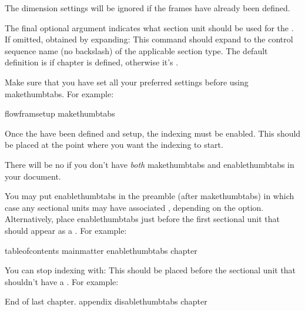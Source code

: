 \documentclass[fontsize=12pt]{scrbook}
\begin{document}
\begin{information}
The dimension settings will be ignored if the 
 frames have already been defined.
\end{information}

The final optional argument 
indicates what section unit should be used for the .
If omitted,  obtained by expanding:
This command should expand to the control sequence name (no
backslash) of the applicable section type. The default definition is
 if \gls{chapter} is defined, otherwise it's
.

Make sure that you have set all your preferred 
settings before using \gls{makethumbtabs}. For example:
\begin{codebox}
\gls{flowframsetup}
\gls{makethumbtabs}\marg{0.75in}
\end{codebox}

Once the   have been defined and
setup, the  indexing must be enabled.
This should be placed at the point where you want
the  indexing to start.

\begin{important}
There will be no  if you don't have \emph{both}
\gls{makethumbtabs} and \gls{enablethumbtabs} in your document.
\end{important}

You may put \gls{enablethumbtabs} in the preamble (after
\gls{makethumbtabs}) in which case any 
sectional units may have associated , depending on
the  option. Alternatively, place
\gls{enablethumbtabs} just before the first sectional unit that
should appear as a . For example:
\begin{codebox*}
\gls{tableofcontents}
\gls{mainmatter}
\gls{enablethumbtabs}
\gls{chapter}
\end{codebox*} 

You can stop indexing  with:
This should be placed before the sectional unit that shouldn't have
a . For example:
\begin{codebox*}
End of last chapter.
\gls{appendix}
\gls{disablethumbtabs}
\gls{chapter}
\end{codebox*}
\end{document}
